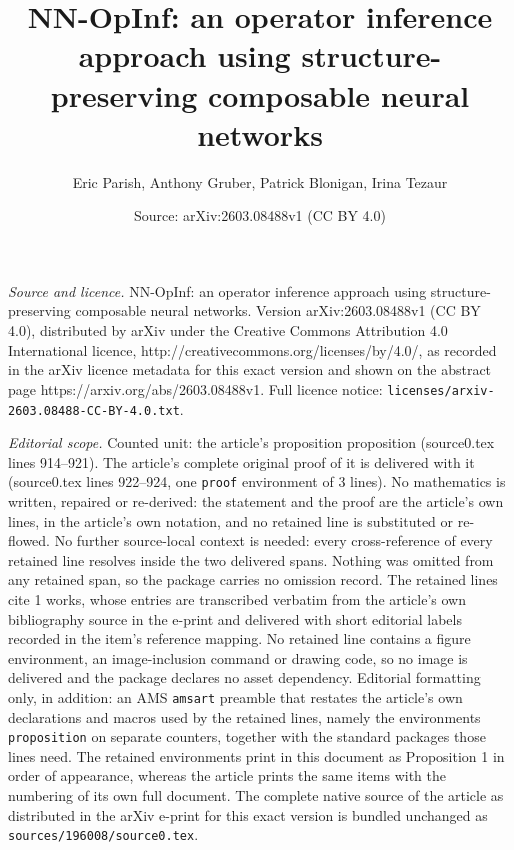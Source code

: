 \documentclass[10pt,a4paper]{amsart}
\title{NN-OpInf: an operator inference approach using structure-preserving composable neural networks}
\author{Eric Parish, Anthony Gruber, Patrick Blonigan, Irina Tezaur}
\date{Source: arXiv:2603.08488v1 (CC BY 4.0)}
\begin{document}
\maketitle

\noindent\emph{Source and licence.} NN-OpInf: an operator inference approach using structure-preserving composable neural networks. Version arXiv:2603.08488v1 (CC BY 4.0), distributed by arXiv under the Creative Commons Attribution 4.0 International licence, http://creativecommons.org/licenses/by/4.0/, as recorded in the arXiv licence metadata for this exact version and shown on the abstract page https://arxiv.org/abs/2603.08488v1. Full licence notice: \texttt{licenses/arxiv-2603.08488-CC-BY-4.0.txt}.\par\smallskip

\noindent\textit{Editorial scope.} Counted unit: the article's proposition proposition (source0.tex lines 914--921). The article's complete original proof of it is delivered with it (source0.tex lines 922--924, one \texttt{proof} environment of 3 lines). No mathematics is written, repaired or re-derived: the statement and the proof are the article's own lines, in the article's own notation, and no retained line is substituted or re-flowed.  No further source-local context is needed: every cross-reference of every retained line resolves inside the two delivered spans.  Nothing was omitted from any retained span, so the package carries no omission record.  The retained lines cite 1 works, whose entries are transcribed verbatim from the article's own bibliography source in the e-print and delivered with short editorial labels recorded in the item's reference mapping.  No retained line contains a figure environment, an image-inclusion command or drawing code, so no image is delivered and the package declares no asset dependency.  Editorial formatting only, in addition: an AMS \texttt{amsart} preamble that restates the article's own declarations and macros used by the retained lines, namely the environments \texttt{proposition} on separate counters, together with the standard packages those lines need.  The retained environments print in this document as Proposition 1 in order of appearance, whereas the article prints the same items with the numbering of its own full document.  The complete native source of the article as distributed in the arXiv e-print for this exact version is bundled unchanged as \texttt{sources/196008/source0.tex}.
\end{document}
